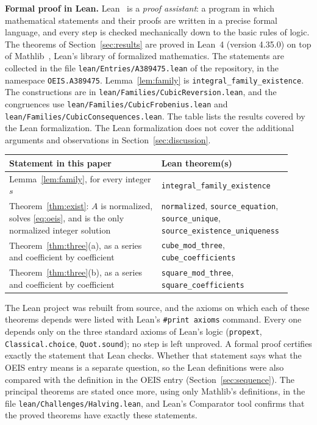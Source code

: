 \documentclass[11pt,a4paper]{article}
\theoremstyle{definition}
\theoremstyle{remark}
\newcommand{\para}[1]{\par\medskip\noindent\textbf{#1}\enspace}
\begin{document}
\para{Formal proof in Lean.}
Lean~\cite{lean} is a \emph{proof assistant}: a program in which mathematical statements and their proofs are written
in a precise formal language, and every step is checked mechanically down to the basic rules of logic. The theorems of Section~\ref{sec:results} are proved in Lean~4 (version 4.35.0) on top of
Mathlib~\cite{mathlib}, Lean's library of formalized mathematics. The statements are collected in the file \texttt{lean/Entries/A389475.lean} of the repository,
in the namespace \texttt{OEIS.A389475}. Lemma~\ref{lem:family} is \texttt{integral\_family\_existence}. The constructions are in \texttt{lean/Families/CubicReversion.lean}, and the congruences use \texttt{lean/Families/CubicFrobenius.lean} and \texttt{lean/Families/CubicConsequences.lean}.
The table lists the results covered by the Lean formalization. The Lean formalization does not cover the additional arguments and observations in Section~\ref{sec:discussion}.
\begin{center}\small\renewcommand{\arraystretch}{1.25}
\begin{tabular}{>{\raggedright\arraybackslash}p{0.52\linewidth}>{\raggedright\arraybackslash}p{0.4\linewidth}}
\toprule
Statement in this paper & Lean theorem(s)\\
\midrule
Lemma~\ref{lem:family}, for every integer $s$ & \texttt{integral\_\allowbreak{}family\_\allowbreak{}existence} \\
Theorem~\ref{thm:exist}: $A$ is normalized, solves \eqref{eq:oeis}, and is the only normalized integer solution & \texttt{normalized}, \texttt{source\_\allowbreak{}equation}, \texttt{source\_\allowbreak{}unique}, \texttt{source\_\allowbreak{}existence\_\allowbreak{}uniqueness} \\
Theorem~\ref{thm:three}(a), as a series and coefficient by coefficient & \texttt{cube\_\allowbreak{}mod\_\allowbreak{}three}, \texttt{cube\_\allowbreak{}coefficients} \\
Theorem~\ref{thm:three}(b), as a series and coefficient by coefficient & \texttt{square\_\allowbreak{}mod\_\allowbreak{}three}, \texttt{square\_\allowbreak{}coefficients} \\
\bottomrule
\end{tabular}
\end{center}
The Lean project was rebuilt from source, and the axioms on which each of these theorems depends were listed with
Lean's \texttt{\#print axioms} command. Every one depends only on the three standard axioms of Lean's logic
(\texttt{propext}, \texttt{Classical.choice}, \texttt{Quot.sound}); no step is left unproved. A formal proof certifies
exactly the statement that Lean checks. Whether that statement says what the OEIS entry means is a separate question,
so the Lean definitions were also compared with the definition in the OEIS entry
(Section~\ref{sec:sequence}). The principal theorems are stated once more, using only Mathlib's definitions, in the
file \texttt{lean/Challenges/Halving.lean}, and Lean's Comparator tool confirms that the
proved theorems have exactly these statements.
\end{document}
